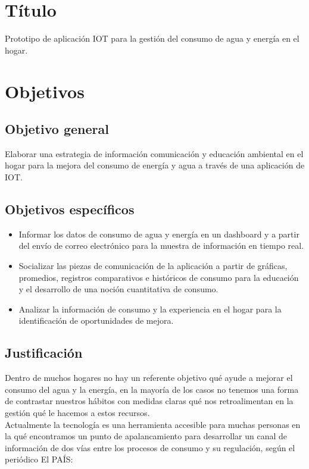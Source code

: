 \documentclass[a4paper,man,natbib]{apa6}
\begin{document}


\section{Título}
Prototipo de aplicación IOT para la gestión del consumo de agua y energía en el hogar.

\section{Objetivos}
\subsection{Objetivo general}
Elaborar una estrategia de información comunicación y educación ambiental en el hogar para la mejora del consumo de energía y agua a través de una aplicación de IOT.

\subsection{Objetivos específicos}
\begin{itemize}
      \item Informar los datos de consumo de agua y energía en un dashboard y a partir del envío de correo electrónico para la muestra de información en tiempo real.
      \item Socializar las piezas de comunicación de la aplicación a partir de gráficas, promedios, registros comparativos e históricos de consumo para la educación y el desarrollo de una noción cuantitativa de consumo.
      \item Analizar la información de consumo y la experiencia en el hogar para la identificación de oportunidades de mejora.
\end{itemize}

\subsection{Justificación}
Dentro de muchos hogares no hay un referente objetivo qué ayude a mejorar el consumo del agua y la energía, en la mayoría de los casos no tenemos una forma de contrastar nuestros hábitos con medidas claras qué nos retroalimentan en la gestión qué le hacemos a estos recursos.\\

Actualmente la tecnología es una herramienta accesible para muchas personas en la qué encontramos un punto de apalancamiento para desarrollar un canal de información de dos vías entre los procesos de consumo y su regulación, según el periódico El PAÍS:\\
\end{document}
